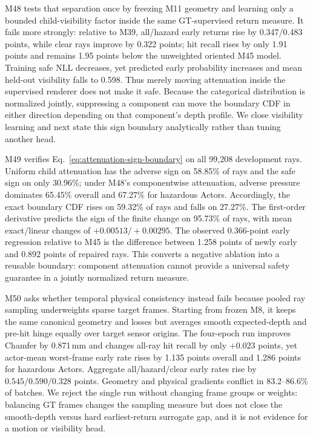 M48 tests that separation once by freezing M11 geometry and learning only a bounded child-visibility factor inside the
same GT-supervised return measure. It fails more strongly: relative to M39, all/hazard early returns rise by 0.347/0.483
points, while clear rays improve by 0.322 points; hit recall rises by only 1.91 points and remains 1.95 points below the
unweighted oriented M45 model. Training safe NLL decreases, yet predicted early probability increases and mean held-out
visibility falls to 0.598. Thus merely moving attenuation inside the supervised renderer does not make it safe. Because
the categorical distribution is normalized jointly, suppressing a component can move the boundary CDF in either
direction depending on that component's depth profile. We close visibility learning and next state this sign boundary
analytically rather than tuning another head.

M49 verifies Eq.~\ref{eq:attenuation-sign-boundary} on all 99,208 development rays. Uniform child attenuation has the
adverse sign on 58.85\% of rays and the safe sign on only 30.96\%; under M48's componentwise attenuation, adverse pressure
dominates 65.45\% overall and 67.27\% for hazardous Actors. Accordingly, the exact boundary CDF rises on 59.32\% of rays
and falls on 27.27\%. The first-order derivative predicts the sign of the finite change on 95.73\% of rays, with mean
exact/linear changes of $+0.00513/+0.00295$. The observed 0.366-point early regression relative to M45 is the difference
between 1.258 points of newly early and 0.892 points of repaired rays. This converts a negative ablation into a reusable
boundary: component attenuation cannot provide a universal safety guarantee in a jointly normalized return measure.

M50 asks whether temporal physical consistency instead fails because pooled ray sampling underweights sparse target frames.
Starting from frozen M8, it keeps the same canonical geometry and losses but averages smooth expected-depth and pre-hit hinge
equally over target sensor origins. The four-epoch run improves Chamfer by 0.871\,mm and changes all-ray hit recall by only
$+0.023$ points, yet actor-mean worst-frame early rate rises by 1.135 points overall and 1.286 points for hazardous Actors.
Aggregate all/hazard/clear early rates rise by $0.545/0.590/0.328$ points. Geometry and physical gradients conflict in
83.2--86.6\% of batches. We reject the single run without changing frame groups or weights: balancing GT frames changes the
sampling measure but does not close the smooth-depth versus hard earliest-return surrogate gap, and it is not evidence for a
motion or visibility head.

